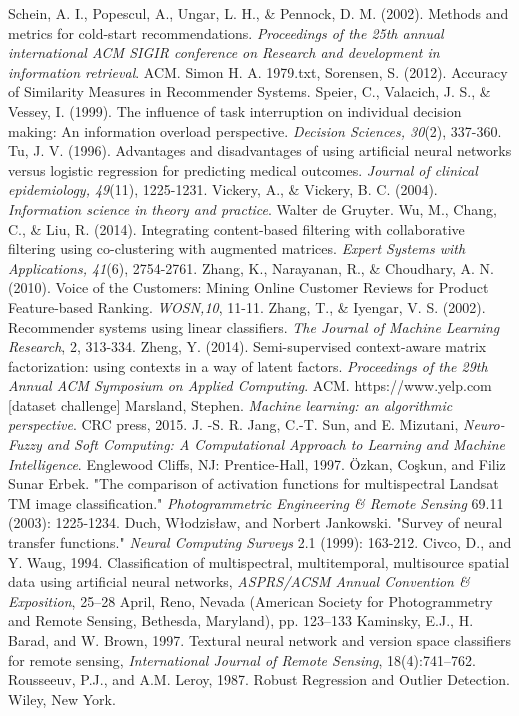 \documentclass[12pt]{article}
\begin{document}
\begin{thebibliography}{100}
 Schein, A. I., Popescul, A., Ungar, L. H., \& Pennock, D. M. (2002). Methods and metrics for cold-start recommendations. \textit{Proceedings of the 25th annual international ACM SIGIR conference on Research and development in information retrieval}. ACM.
 Simon H. A. 1979.txt,
 Sorensen, S. (2012). Accuracy of Similarity Measures in Recommender Systems.
 Speier, C., Valacich, J. S., \& Vessey, I. (1999). The influence of task interruption on individual decision making: An information overload perspective. \textit{Decision Sciences, 30}(2), 337-360.
 Tu, J. V. (1996). Advantages and disadvantages of using artificial neural networks versus logistic regression for predicting medical outcomes. \textit{Journal of clinical epidemiology, 49}(11), 1225-1231.
 Vickery, A., \& Vickery, B. C. (2004). \textit{Information science in theory and practice}. Walter de Gruyter.
 Wu, M., Chang, C., \& Liu, R. (2014). Integrating content-based filtering with collaborative filtering using co-clustering with augmented matrices. \textit{Expert Systems with Applications, 41}(6), 2754-2761.
 Zhang, K., Narayanan, R., \& Choudhary, A. N. (2010). Voice of the Customers: Mining Online Customer Reviews for Product Feature-based Ranking. \textit{WOSN,10}, 11-11.
 Zhang, T., \& Iyengar, V. S. (2002). Recommender systems using linear classifiers. \textit{The Journal of Machine Learning Research}, 2, 313-334.
 Zheng, Y. (2014). Semi-supervised context-aware matrix factorization: using contexts in a way of latent factors. \textit{Proceedings of the 29th Annual ACM Symposium on Applied Computing}. ACM.
 https://www.yelp.com [dataset challenge]
 Marsland, Stephen. \textit{Machine learning: an algorithmic perspective}. CRC press, 2015.
 J. -S. R. Jang, C.-T. Sun, and E. Mizutani, \textit{Neuro-Fuzzy and Soft Computing: A Computational Approach to Learning and Machine Intelligence}. Englewood Cliffs, NJ: Prentice-Hall, 1997.
 Özkan, Coşkun, and Filiz Sunar Erbek. "The comparison of activation functions for multispectral Landsat TM image classification." \textit{Photogrammetric Engineering \& Remote Sensing} 69.11 (2003): 1225-1234.
 Duch, Włodzisław, and Norbert Jankowski. "Survey of neural transfer functions." \textit{Neural Computing Surveys} 2.1 (1999): 163-212.
 Civco, D., and Y. Waug, 1994. Classification of multispectral, multitemporal, multisource spatial data using artificial neural networks, \textit{ASPRS/ACSM Annual Convention \& Exposition}, 25–28 April, Reno, Nevada (American Society for Photogrammetry and Remote Sensing, Bethesda, Maryland), pp. 123–133 
 Kaminsky, E.J., H. Barad, and W. Brown, 1997. Textural neural network and version space classifiers for remote sensing, \textit{International Journal of Remote Sensing}, 18(4):741–762.
 Rousseeuv, P.J., and A.M. Leroy, 1987. Robust Regression and Outlier Detection. Wiley, New York.

\end{thebibliography} 
\end{document}

